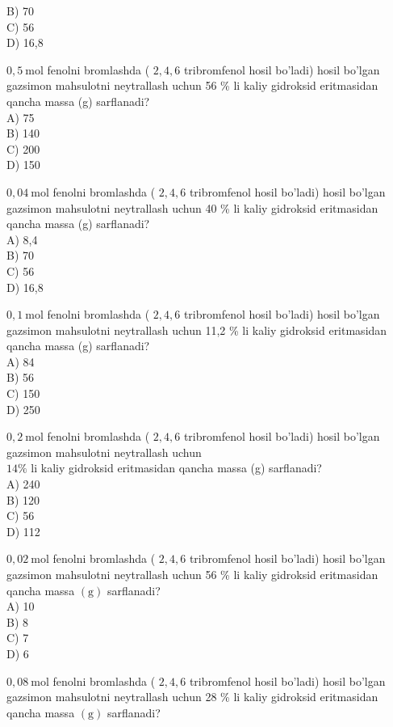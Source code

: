 B) 70\\
C) 56\\
D) 16,8
  \item $0,5 \mathrm{~mol}$ fenolni bromlashda ( $2,4,6$ tribromfenol hosil bo'ladi) hosil bo'lgan gazsimon mahsulotni neytrallash uchun 56 \% li kaliy gidroksid eritmasidan qancha massa (g) sarflanadi?\\
A) 75\\
B) 140\\
C) 200\\
D) 150
  \item $0,04 \mathrm{~mol}$ fenolni bromlashda ( $2,4,6$ tribromfenol hosil bo'ladi) hosil bo'lgan gazsimon mahsulotni neytrallash uchun 40 \% li kaliy gidroksid eritmasidan qancha massa (g) sarflanadi?\\
A) 8,4\\
B) 70\\
C) 56\\
D) 16,8
  \item $0,1 \mathrm{~mol}$ fenolni bromlashda ( $2,4,6$ tribromfenol hosil bo'ladi) hosil bo'lgan gazsimon mahsulotni neytrallash uchun 11,2 \% li kaliy gidroksid eritmasidan qancha massa (g) sarflanadi?\\
A) 84\\
B) 56\\
C) 150\\
D) 250
  \item $0,2 \mathrm{~mol}$ fenolni bromlashda ( $2,4,6$ tribromfenol hosil bo'ladi) hosil bo'lgan gazsimon mahsulotni neytrallash uchun\\
$14 \%$ li kaliy gidroksid eritmasidan qancha massa (g) sarflanadi?\\
A) 240\\
B) 120\\
C) 56\\
D) 112
  \item $0,02 \mathrm{~mol}$ fenolni bromlashda ( $2,4,6$ tribromfenol hosil bo'ladi) hosil bo'lgan gazsimon mahsulotni neytrallash uchun 56 \% li kaliy gidroksid eritmasidan qancha massa $(\mathrm{g})$ sarflanadi?\\
A) 10\\
B) 8\\
C) 7\\
D) 6
  \item $0,08 \mathrm{~mol}$ fenolni bromlashda ( $2,4,6$ tribromfenol hosil bo'ladi) hosil bo'lgan gazsimon mahsulotni neytrallash uchun 28 \% li kaliy gidroksid eritmasidan qancha massa $(\mathrm{g})$ sarflanadi?\\
